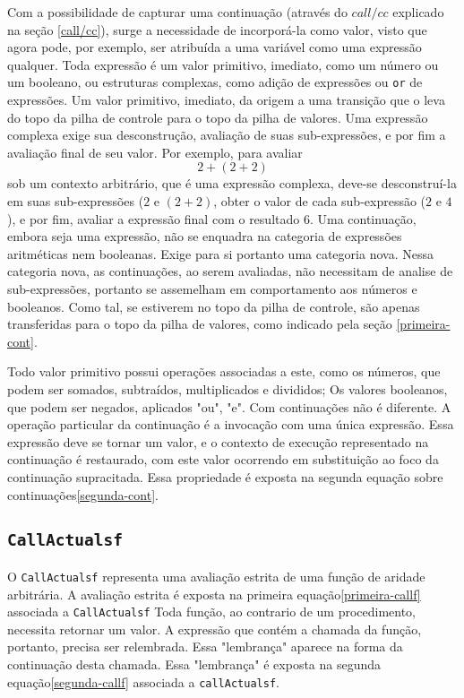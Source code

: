 Com a possibilidade de capturar uma continuação (através do $\mathit{call/cc}$ explicado na seção \ref{call/cc}), surge a necessidade de incorporá-la como valor, visto que agora pode, por exemplo, ser atribuída a uma variável como uma expressão qualquer. Toda expressão é um valor primitivo, imediato, como um número ou um booleano, ou estruturas complexas, como adição de expressões ou \texttt{or} de expressões. Um valor primitivo, imediato, da origem a uma transição que o leva do topo da pilha de controle para o topo da pilha de valores. Uma expressão complexa exige sua desconstrução, avaliação de suas sub-expressões, e por fim a avaliação final de seu valor. Por exemplo, para avaliar $$2+(2+2)$$ sob um contexto arbitrário, que é uma expressão complexa, deve-se desconstruí-la em suas sub-expressões ($2$ e $(2+2)$, obter o valor de cada sub-expressão ($2$ e $4$), e por fim, avaliar a expressão final com o resultado $6$. Uma continuação, embora seja uma expressão, não se enquadra na categoria de expressões aritméticas nem booleanas. Exige para si portanto uma categoria nova. Nessa categoria nova, as continuações, ao serem avaliadas, não necessitam de analise de sub-expressões, portanto se assemelham em comportamento aos números e booleanos. Como tal, se estiverem no topo da pilha de controle, são apenas transferidas para o topo da pilha de valores, como indicado pela seção \ref{primeira-cont}.

Todo valor primitivo possui operações associadas a este, como os números, que podem ser somados, subtraídos, multiplicados e divididos; Os valores booleanos, que podem ser negados, aplicados "ou", "e". Com continuações não é diferente. A operação particular da continuação é a invocação com uma única expressão. Essa expressão deve se tornar um valor, e o contexto de execução representado na continuação é restaurado, com este valor ocorrendo em substituição ao foco da continuação supracitada. Essa propriedade é exposta na segunda equação sobre continuações\ref{segunda-cont}.

\subsection{\texttt{CallActualsf}}

O \texttt{CallActualsf} representa uma avaliação estrita de uma função de aridade arbitrária. A avaliação estrita é exposta na primeira equação\ref{primeira-callf} associada a \texttt{CallActualsf}
Toda função, ao contrario de um procedimento, necessita retornar um valor.
A expressão que contém a chamada da função, portanto, precisa ser relembrada.
Essa "lembrança" aparece na forma da continuação desta chamada. Essa "lembrança" é exposta na segunda equação\ref{segunda-callf} associada a \texttt{callActualsf}.

